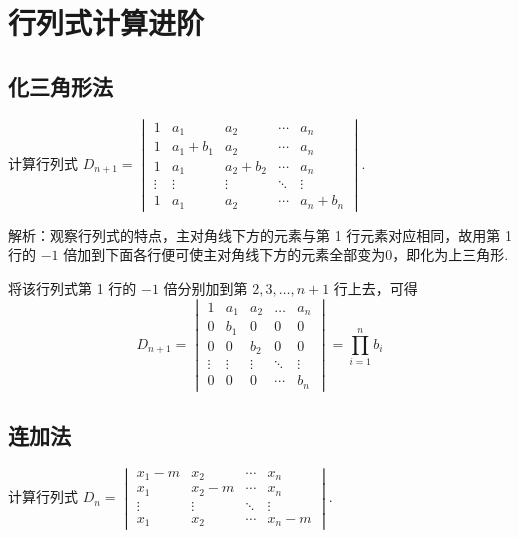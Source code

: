\chapter{行列式计算进阶}

\section{化三角形法}
\begin{example}
    计算行列式
    $D_{n+1}=\begin{vmatrix}
    1 & a_{1} & a_{2} & \cdots & a_n \\
    1 & a_{1}+b_{1} & a_{2} & \cdots & a_n \\
    1 & a_{1} & a_{2}+b_{2} & \cdots & a_n \\
    \vdots & \vdots & \vdots & \ddots & \vdots \\
    1 & a_{1} & a_{2} & \cdots & a_n+b_{n}
    \end{vmatrix}$.
\end{example}

解析：观察行列式的特点，主对角线下方的元素与第 1 行元素对应相同，故用第 1 行的 $-1$ 倍加到下面各行便可使主对角线下方的元素全部变为0，即化为上三角形.

\begin{solution}
    将该行列式第 1 行的 $-1$ 倍分别加到第 $2,3,\ldots,n+1$ 行上去，可得
    \[ D_{n+1}=\begin{vmatrix}
        1 & a_{1} & a_{2} & \ldots & a_n \\
        0 & b_{1} & 0 & 0 & 0 \\
        0 & 0 & b_{2} & 0 & 0 \\
        \vdots & \vdots & \vdots & \ddots & \vdots \\
        0 & 0 & 0 & \cdots & b_{n}
    \end{vmatrix}=\prod_{i=1}^n b_i \]
\end{solution}

\section{连加法}

\begin{example}
    计算行列式
    $D_n=\begin{vmatrix}
    x_1-m & x_2 & \cdots & x_n \\
    x_1 & x_2-m & \cdots & x_n \\
    \vdots & \vdots & \ddots & \vdots \\
    x_1 & x_2 & \cdots & x_n-m
    \end{vmatrix}$.
\end{example}

